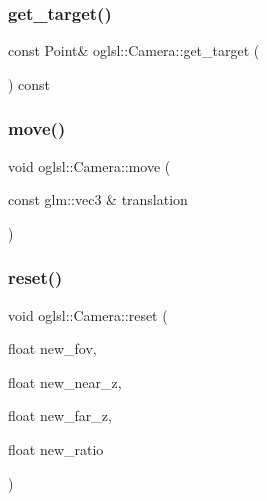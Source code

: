 \mbox{\label{classoglsl_1_1_camera_ad326436aa613e959f4af37f55f2d3bdb}} 
\subsubsection{\texorpdfstring{get\+\_\+target()}{get\_target()}}
{\footnotesize\ttfamily const Point\& oglsl\+::\+Camera\+::get\+\_\+target (\begin{DoxyParamCaption}{ }\end{DoxyParamCaption}) const\hspace{0.3cm}{\ttfamily [inline]}}

\mbox{\label{classoglsl_1_1_camera_af53ebc56e9465ce12f559c02ecd453a8}} 
\subsubsection{\texorpdfstring{move()}{move()}}
{\footnotesize\ttfamily void oglsl\+::\+Camera\+::move (\begin{DoxyParamCaption}\item[{const glm\+::vec3 \&}]{translation }\end{DoxyParamCaption})\hspace{0.3cm}{\ttfamily [inline]}}

\mbox{\label{classoglsl_1_1_camera_a1ed2ab7da65d3c57b6a77a64c3a0a721}} 
\subsubsection{\texorpdfstring{reset()}{reset()}}
{\footnotesize\ttfamily void oglsl\+::\+Camera\+::reset (\begin{DoxyParamCaption}\item[{float}]{new\+\_\+fov,  }\item[{float}]{new\+\_\+near\+\_\+z,  }\item[{float}]{new\+\_\+far\+\_\+z,  }\item[{float}]{new\+\_\+ratio }\end{DoxyParamCaption})\hspace{0.3cm}{\ttfamily [inline]}}

